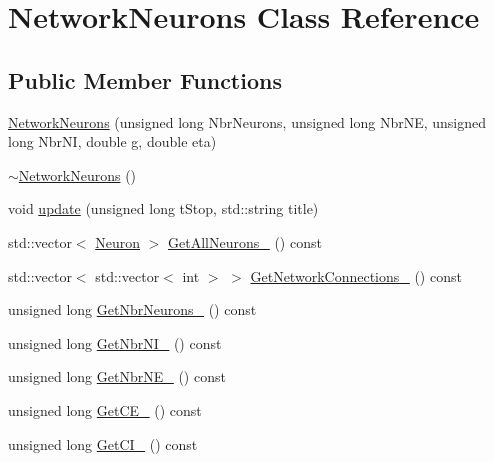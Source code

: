 \hypertarget{classNetworkNeurons}{\section{Network\-Neurons Class Reference}
\label{classNetworkNeurons}
}
\subsection*{Public Member Functions}
\begin{DoxyCompactItemize}
\item 
\hyperlink{classNetworkNeurons_a85d14e627ed6be6077d45ab4a59f519f}{Network\-Neurons} (unsigned long Nbr\-Neurons, unsigned long Nbr\-N\-E, unsigned long Nbr\-N\-I, double g, double eta)
\item 
\hyperlink{classNetworkNeurons_a96d9c4e226bfd0acf22097cffb9c6a5f}{$\sim$\-Network\-Neurons} ()
\item 
void \hyperlink{classNetworkNeurons_a54a791d2f3e64b333e8b195644b6f90c}{update} (unsigned long t\-Stop, std\-::string title)
\item 
std\-::vector$<$ \hyperlink{classNeuron}{Neuron} $>$ \hyperlink{classNetworkNeurons_a6601ea8c8fd909aa9f33edf3d8f8b24c}{Get\-All\-Neurons\-\_\-} () const 
\item 
std\-::vector$<$ std\-::vector$<$ int $>$ $>$ \hyperlink{classNetworkNeurons_abd9af677875dfd2ca7bca44fda2007be}{Get\-Network\-Connections\-\_\-} () const 
\item 
unsigned long \hyperlink{classNetworkNeurons_ad6b040b3fb4cad3995206fd827708a4f}{Get\-Nbr\-Neurons\-\_\-} () const 
\item 
unsigned long \hyperlink{classNetworkNeurons_aa2f526dc0308c6f68934f95af01448e2}{Get\-Nbr\-N\-I\-\_\-} () const 
\item 
unsigned long \hyperlink{classNetworkNeurons_a0583058a581aed7e85bfa6f44505a1b7}{Get\-Nbr\-N\-E\-\_\-} () const 
\item 
unsigned long \hyperlink{classNetworkNeurons_add06f4c3781aba52dc88052b68f2c592}{Get\-C\-E\-\_\-} () const 
\item 
unsigned long \hyperlink{classNetworkNeurons_aa7ea29b5a1483207a9b03cbc40ffddb8}{Get\-C\-I\-\_\-} () const 
\end{DoxyCompactItemize}


